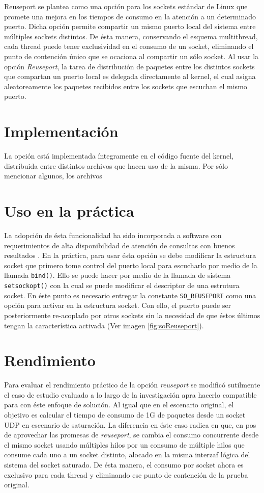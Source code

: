 Reuseport se plantea como una opción para los sockets estándar de Linux que promete una mejora en los tiempos de consumo en la atención a un determinado puerto. Dicha opción permite compartir un mismo puerto local del sistema entre múltiples sockets distintos. De ésta manera, conservando el esquema multithread, cada thread puede tener exclusividad en el consumo de un socket, eliminando el punto de contención único que se ocaciona al compartir un sólo socket. Al usar la opción \emph{Reuseport}, la tarea de distribución de paquetes entre los distintos sockets que compartan un puerto local es delegada directamente al kernel, el cual asigna aleatoreamente los paquetes recibidos entre los sockets que escuchan el mismo puerto.

\section{Implementación}
La opción está implementada íntegramente en el código fuente del kernel, distribuida entre distintos archivos que hacen uso de la misma. Por sólo mencionar algunos, los archivos 


\section{Uso en la práctica}
La adopción de ésta funcionalidad ha sido incorporada a software con requerimientos de alta disponibilidad de atención de consultas con buenos resultados \cite{paper:apache}. En la práctica, para usar ésta opción se debe modificar la estructura socket que primero tome control del puerto local para escucharlo por medio de la llamada \verb=bind()=. Ello se puede hacer por medio de la llamada de sistema \verb=setsockopt()= con la cual se puede modificar el descriptor de una estrutura socket. En éste punto es necesario entregar la constante \verb=SO_REUSEPORT= como una opción para activar en la estructura socket. Con ello, el puerto puede ser posteriormente re-acoplado por otros sockets sin la necesidad de que éstos últimos tengan la característica activada (Ver imagen \ref{fig:soReuseport}).

\section{Rendimiento}
Para evaluar el rendimiento práctico de la opción \emph{reuseport} se modificó sutilmente el caso de estudio evaluado a lo largo de la investigación apra hacerlo compatible para con éste enfoque de solución. Al igual que en el escenario original, el objetivo es calcular el tiempo de consumo de 1G de paquetes desde un socket UDP en escenario de saturación. La diferencia en éste caso radica en que, en pos de aprovechar las promesas de \emph{reuseport}, se cambia el consumo concurrente desde el mismo socket usando múltiples hilos por un consumo de múltiple hilos que consume cada uno a un socket distinto, alocado en la misma interzaf lógica del sistema del socket saturado. De ésta manera, el consumo por socket ahora es exclusivo para cada thread y eliminando ese punto de contención de la prueba original.

